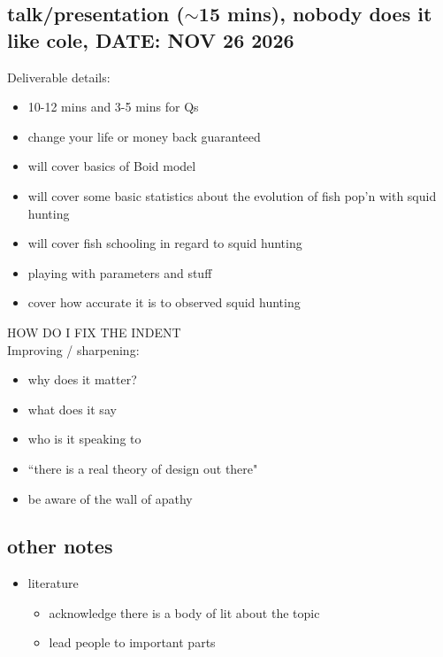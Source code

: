 \documentclass[12pt]{article}
\begin{document}
\subsection{talk/presentation ($\sim$15 mins), nobody does it like cole, DATE: NOV 26 2026}
Deliverable details:
\begin{itemize}
    \item 10-12 mins and 3-5 mins for Qs
    \item change your life or money back guaranteed
    \item will cover basics of Boid model
    \item will cover some basic statistics about the evolution of fish pop'n with squid hunting
    \item will cover fish schooling in regard to squid hunting
    \item playing with parameters and stuff
    \item cover how accurate it is to observed squid hunting
\end{itemize}

HOW DO I FIX THE INDENT \\ %
Improving / sharpening:
\begin{itemize}
    \item why does it matter?
    \item what does it say
    \item who is it speaking to
    \item ``there is a real theory of design out there"
    \item be aware of the wall of apathy
\end{itemize}

\subsection{other notes}
\begin{itemize}
    \item literature
    \begin{itemize}
        \item acknowledge there is a body of lit about the topic
        \item lead people to important parts
    \end{itemize}
\end{itemize}
\end{document}
